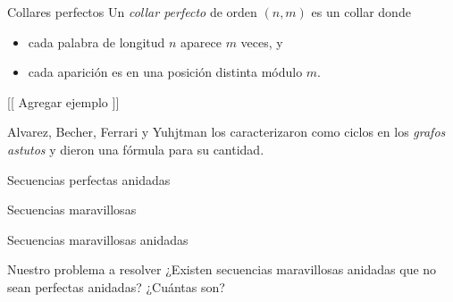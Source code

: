 \documentclass[spanish,xcolor={table}]{beamer}
\begin{document}

\begin{frame}{Collares perfectos}
  Un \emph{collar perfecto} de orden $(n,m)$ es un collar donde
  \begin{itemize}
    \item cada palabra de longitud $n$ aparece $m$ veces, y
    \item cada aparición es en una posición distinta módulo $m$.
  \end{itemize}

  \begin{example}
  {[[ Agregar ejemplo ]]}
  \end{example}

  Alvarez, Becher, Ferrari y Yuhjtman los caracterizaron como ciclos en los
  \emph{grafos astutos} y dieron una fórmula para su cantidad.  
\end{frame}


\begin{frame}{Secuencias perfectas anidadas}
\end{frame}


\begin{frame}{Secuencias maravillosas}
\end{frame}


\begin{frame}{Secuencias maravillosas anidadas}
\end{frame}


\begin{frame}{Nuestro problema a resolver}
  ¿Existen secuencias maravillosas anidadas que no sean perfectas anidadas? ¿Cuántas son?
\end{frame}

\end{document}
